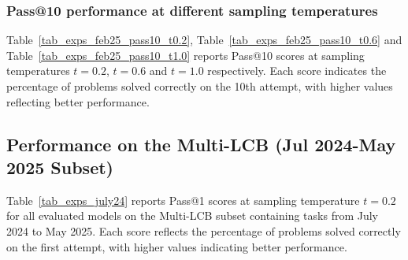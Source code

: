 \documentclass{article} %
\begin{document}







\subsubsection{Pass@10 performance at different sampling temperatures}



Table~\ref{tab_exps_feb25_pass10_t0.2}, Table~\ref{tab_exps_feb25_pass10_t0.6} and Table~\ref{tab_exps_feb25_pass10_t1.0} reports Pass@10 scores at sampling temperatures $t=0.2$, $t=0.6$ and $t=1.0$ respectively. Each score indicates the percentage of problems solved correctly on the 10th attempt, with higher values reflecting better performance. 

\subsection{Performance on the Multi-LCB (Jul 2024-May 2025 Subset)}

Table~\ref{tab_exps_july24} reports Pass@1 scores at sampling temperature $t = 0.2$ for all evaluated models on the Multi-LCB subset containing tasks from July 2024 to May 2025. Each score reflects the percentage of problems solved correctly on the first attempt, with higher values indicating better performance.
 
\end{document}
